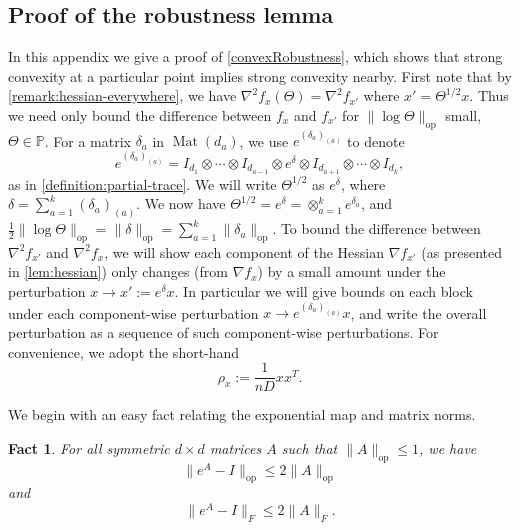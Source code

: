 \documentclass[aos]{imsart}
\newtheorem{fact}[theorem]{Fact}
\theoremstyle{definition}
\numberwithin{equation}{section}
\DeclareMathOperator{\op}{op}
\DeclareMathOperator{\Mat}{Mat}
\renewcommand{\P}{{\mathbb{P}}}
\newcommand{\samp}{x}
\newcommand{\MW}[1]{{\color{red}[MW: #1]}}
\newcommand{\MW}[1]{{}}
\begin{document}
\begin{appendix}

\section{Proof of the robustness lemma}\label{app:robust}
In this appendix we give a proof of \cref{convexRobustness}, which shows that strong convexity at a particular point implies strong convexity nearby.
First note that by \cref{remark:hessian-everywhere}, we have $\nabla^2 f_\samp(\Theta) = \nabla^2 f_{\samp'}$ where $\samp' = \Theta^{1/2} \samp$.
Thus we need only bound the difference between $f_\samp$ and $f_{\samp'}$ for $\|\log \Theta\|_{\op}$ small, $\Theta \in \P$.
For a matrix $\delta_{a}$ in $\Mat(d_a)$, we use
$e^{(\delta_{a})_{(a)}}$ to denote
$$ e^{(\delta_{a})_{(a)}} = I_{d_1} \otimes \cdots \otimes I_{d_{a-1}} \otimes e^{\delta} \otimes I_{d_{a+1}} \otimes \cdots \otimes I_{d_k},$$
as in \cref{definition:partial-trace}.
We will write $\Theta^{1/2}$ as $e^{\delta}$, where $\delta = \sum_{a=1}^k (\delta_{a})_{(a)}$.
We now have
$\Theta^{1/2} = e^{\delta} = \otimes_{a = 1}^k e^{\delta_a}$, and $\frac{1}{2}\|\log \Theta\|_{\op} = \|\delta\|_{\op} = \sum_{a =1}^k \|\delta_{a}\|_{\op}$.
To bound the difference between $\nabla^2 f_{x'}$ and $\nabla^2 f_x$, we will show each component of the Hessian $\nabla f_{x'}$ (as presented in \cref{lem:hessian}) only changes (from $\nabla f_x$) by a small amount under the perturbation $x \to x' := e^\delta x$.
In particular we will give bounds on each block under each component-wise perturbation $x \to e^{(\delta_{a})_{(a)}} x$, and write the overall perturbation as a sequence of such component-wise perturbations. For convenience, we adopt the short-hand
$$ \rho_x:= \frac{1}{nD} x x^T.$$



We begin with an easy fact relating the exponential map and matrix norms.

\begin{fact} \label{f:expTaylor} For all symmetric $d\times d$ matrices $A$ such that $ \|A\|_{\op} \leq 1$, we have
$$ \|e^{A} - I\|_{\op} \leq 2 \|A\|_{\op}$$
and
$$ \|e^{A} - I\|_{F} \leq 2 \|A\|_{F}. $$
\end{fact}



\end{appendix}
\end{document}
